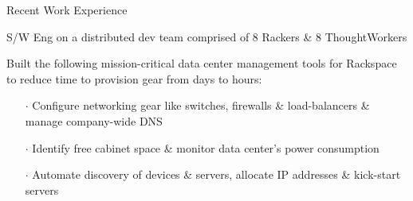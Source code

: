 \documentclass{resume} %
\begin{document}
\begin{rSection}{Recent Work Experience}

\begin{rSubsection}{}{}{}{}
{S/W Eng on a distributed dev team comprised of 8 Rackers \& 8 ThoughtWorkers}

\item Built the following mission-critical data center management tools for Rackspace to reduce time to provision gear from days to hours:
\vspace{-0.5em}
\begin{itemize}  \itemsep0.5pt \parskip0pt
    \item[$\cdot$] Configure networking gear like switches, firewalls \& load-balancers \& manage company-wide DNS
    \item[$\cdot$] Identify free cabinet space \& monitor data center's power consumption
    \item[$\cdot$] Automate discovery of devices \& servers, allocate IP addresses \& kick-start servers
\end{itemize}

\end{rSubsection}








\end{rSection}
\end{document}
